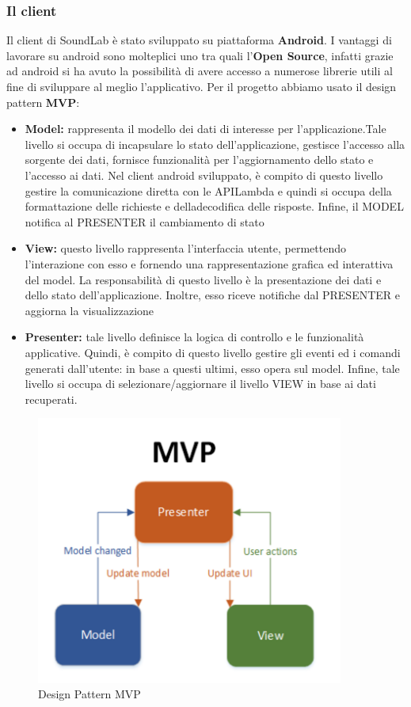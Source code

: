 \documentclass{article}
\begin{document}
		\subsubsection{Il client}
		Il client di SoundLab è stato sviluppato su piattaforma \textbf{Android}. I vantaggi di lavorare su android sono molteplici uno tra quali l’\textbf{Open Source}, infatti grazie ad android si ha avuto la possibilità di avere accesso a numerose librerie utili al fine di sviluppare al meglio l'applicativo.
		Per il progetto abbiamo usato il design pattern \textbf{MVP}:
		\begin{itemize}
			\item \textbf{Model:} rappresenta il modello dei dati di interesse per l’applicazione.Tale livello si occupa di incapsulare lo stato dell’applicazione, gestisce l’accesso alla sorgente dei dati, fornisce funzionalità per l’aggiornamento dello stato e l’accesso ai dati. Nel client android sviluppato, è compito di questo livello gestire la comunicazione diretta con le APILambda e quindi si occupa della formattazione delle richieste e delladecodifica delle risposte. Infine, il MODEL notifica al PRESENTER il cambiamento di stato
			\item \textbf{View:} questo livello rappresenta l’interfaccia utente, permettendo l’interazione con esso e fornendo una rappresentazione grafica ed interattiva del model. La responsabilità di questo livello è la presentazione dei dati e dello stato dell’applicazione. Inoltre, esso riceve notifiche dal PRESENTER e aggiorna la visualizzazione
			\item \textbf{Presenter:} tale livello definisce la logica di controllo e le funzionalità applicative. Quindi, è compito di questo livello gestire gli eventi ed i comandi generati dall’utente: in base a questi ultimi, esso opera sul model. Infine, tale livello si occupa di selezionare/aggiornare il livello VIEW in base ai dati recuperati.
		\end{itemize}
		\begin{figure}[H]
			\centering
			\includegraphics[width=0.9\textwidth]{Immagini/mvp}
			\caption{Design Pattern MVP}
		\end{figure}
		\newpage
\end{document}
